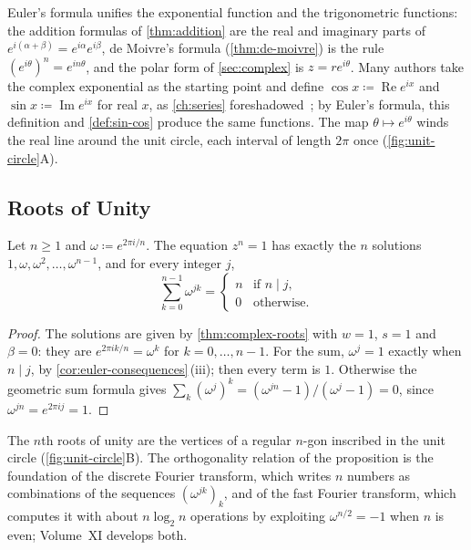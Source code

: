 Euler's formula unifies the exponential function and the trigonometric functions: the addition formulas of \cref{thm:addition} are the real and imaginary parts of $e^{i(\alpha+\beta)}=e^{i\alpha}e^{i\beta}$, de Moivre's formula (\cref{thm:de-moivre}) is the rule $(e^{i\theta})^n=e^{in\theta}$, and the polar form of \cref{sec:complex} is $z=re^{i\theta}$. Many authors take the complex exponential as the starting point and define $\cos x\coloneqq\operatorname{Re}e^{ix}$ and $\sin x\coloneqq\operatorname{Im}e^{ix}$ for real $x$, as \cref{ch:series} foreshadowed~\cite{rudin1976}; by Euler's formula, this definition and \cref{def:sin-cos} produce the same functions. The map $\theta\mapsto e^{i\theta}$ winds the real line around the unit circle, each interval of length $2\pi$ once (\cref{fig:unit-circle}A).

\subsection{Roots of Unity}

\begin{proposition}
\label{prop:roots-of-unity}
Let $n\ge1$ and $\omega\coloneqq e^{2\pi i/n}$. The equation $z^n=1$ has exactly the $n$ solutions $1,\omega,\omega^2,\ldots,\omega^{n-1}$, and for every integer $j$,
\[
\sum_{k=0}^{n-1}\omega^{jk}=\begin{cases}n&\text{if }n\mid j,\\0&\text{otherwise.}\end{cases}
\]
\end{proposition}

\begin{proof}
The solutions are given by \cref{thm:complex-roots} with $w=1$, $s=1$ and $\beta=0$: they are $e^{2\pi ik/n}=\omega^k$ for $k=0,\ldots,n-1$. For the sum, $\omega^j=1$ exactly when $n\mid j$, by \cref{cor:euler-consequences}\,(iii); then every term is $1$. Otherwise the geometric sum formula gives $\sum_k(\omega^j)^k=(\omega^{jn}-1)/(\omega^j-1)=0$, since $\omega^{jn}=e^{2\pi ij}=1$.
\end{proof}

The $n$th roots of unity are the vertices of a regular $n$-gon inscribed in the unit circle (\cref{fig:unit-circle}B). The orthogonality relation of the proposition is the foundation of the discrete Fourier transform, which writes $n$ numbers as combinations of the sequences $(\omega^{jk})_k$, and of the fast Fourier transform, which computes it with about $n\log_2n$ operations by exploiting $\omega^{n/2}=-1$ when $n$ is even; Volume~XI develops both.


